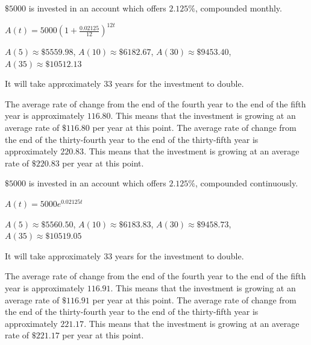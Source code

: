 \documentclass{ximera}
\begin{document}
\begin{question}
\begin{problem}
\end{problem}

\begin{problem}
    $\$5000$ is invested in an account which offers $2.125 \%$, compounded monthly.

\begin{solution}
    $A(t) = 5000\left(1 + \frac{0.02125}{12}\right)^{12t}$ 
\end{solution}

\begin{solution}
    $A(5) \approx \$ 5559.98$, $A(10) \approx \$ 6182.67$, $A(30) \approx \$ 9453.40$, $A(35) \approx \$ 10512.13$ 
\end{solution}

\begin{solution}
    It will take approximately $33$ years for the investment to double.
\end{solution}

\begin{solution}
    The average rate of change from the end of the fourth year to the end of the fifth year is approximately $116.80$.  This means that the investment is growing at an average rate of $\$116.80$ per year at this point.  The average rate of change from the end of the thirty-fourth year to the end of the thirty-fifth year is approximately $220.83$.  This means that the investment is growing at an average rate of $\$220.83$ per year at this point. 
\end{solution}
    
\end{problem}

\begin{problem}\label{basicinterestexlast}
    $\$5000$ is invested in an account which offers $2.125 \%$, compounded continuously. 

\begin{solution}
    $A(t) = 5000e^{0.02125t}$
\end{solution}

\begin{solution}
     $A(5) \approx \$ 5560.50$, $A(10) \approx \$ 6183.83$, $A(30) \approx \$ 9458.73$, $A(35) \approx \$ 10519.05$ 
\end{solution}

\begin{solution}
    It will take approximately $33$ years for the investment to double.
\end{solution}

\begin{solution}
    The average rate of change from the end of the fourth year to the end of the fifth year is approximately $116.91$.  This means that the investment is growing at an average rate of $\$116.91$ per year at this point.  The average rate of change from the end of the thirty-fourth year to the end of the thirty-fifth year is approximately $221.17$.  This means that the investment is growing at an average rate of $\$221.17$ per year at this point. 
\end{solution}
    

\end{problem}
\end{question}
\end{document}
